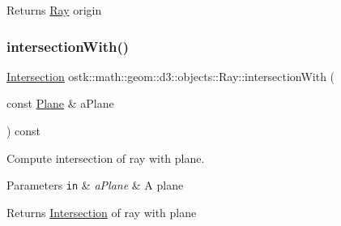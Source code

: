 \begin{DoxyReturn}{Returns}
\hyperlink{classostk_1_1math_1_1geom_1_1d3_1_1objects_1_1_ray}{Ray} origin 
\end{DoxyReturn}
\mbox{\label{classostk_1_1math_1_1geom_1_1d3_1_1objects_1_1_ray_aa4625c2dfe200ab9df245d2a4dc92f64}} 
\subsubsection{\texorpdfstring{intersection\+With()}{intersectionWith()}\hspace{0.1cm}{\footnotesize\ttfamily [1/3]}}
{\footnotesize\ttfamily \hyperlink{classostk_1_1math_1_1geom_1_1d3_1_1_intersection}{Intersection} ostk\+::math\+::geom\+::d3\+::objects\+::\+Ray\+::intersection\+With (\begin{DoxyParamCaption}\item[{const \hyperlink{classostk_1_1math_1_1geom_1_1d3_1_1objects_1_1_plane}{Plane} \&}]{a\+Plane }\end{DoxyParamCaption}) const}



Compute intersection of ray with plane. 


\begin{DoxyParams}[1]{Parameters}
\mbox{\tt in}  & {\em a\+Plane} & A plane \\
\hline
\end{DoxyParams}
\begin{DoxyReturn}{Returns}
\hyperlink{classostk_1_1math_1_1geom_1_1d3_1_1_intersection}{Intersection} of ray with plane 
\end{DoxyReturn}
\mbox{\label{classostk_1_1math_1_1geom_1_1d3_1_1objects_1_1_ray_a41019b87b1221c265ce11974e6ddf7be}} 
